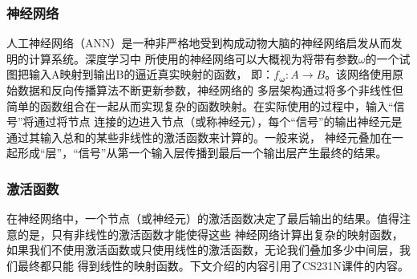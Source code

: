 \documentclass[supercite]{HustGraduPaper}
\theoremstyle{definition}
\begin{document}
\subsubsection{神经网络}

人工神经网络（ANN）是一种非严格地受到构成动物大脑的神经网络启发从而发明的计算系统\cite{wikipedia}。深度学习中
所使用的神经网络可以大概视为将带有参数$\omega$的一个试图把输入A映射到输出B的逼近真实映射的函数，
即：$f_{\boldsymbol{\omega}}: A \rightarrow B$。该网络使用原始数据和反向传播算法不断更新参数，神经网络的
多层架构通过将多个非线性但简单的函数组合在一起从而实现复杂的函数映射。在实际使用的过程中，输入“信号”将通过将节点
连接的边进入节点（或称神经元），每个“信号”的输出神经元是通过其输入总和的某些非线性的激活函数来计算的。一般来说，
神经元叠加在一起形成“层”，“信号”从第一个输入层传播到最后一个输出层产生最终的结果。

\subsubsection{激活函数}

在神经网络中，一个节点（或神经元）的激活函数决定了最后输出的结果。值得注意的是，只有非线性的激活函数才能使得这些
神经网络计算出复杂的映射函数，如果我们不使用激活函数或只使用线性的激活函数，无论我们叠加多少中间层，我们最终都只能
得到线性的映射函数。下文介绍的内容引用了CS231N课件的内容\cite{cs231n}。
\end{document}
